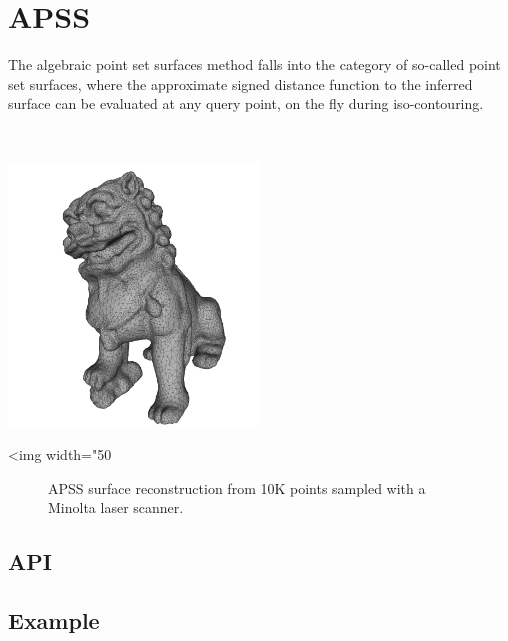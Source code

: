 \section{APSS}

The algebraic point set surfaces method falls \cite{Guennebaud07}  into the category of so-called point set surfaces, where the approximate signed distance function to the inferred surface can be evaluated at any query point, on the fly during iso-contouring.

  \\

\begin{center}
    \label{Surface_reconstruction_points_3-fig-APSS}
    \begin{ccTexOnly}
        \includegraphics[width=0.5\textwidth]{Surface_reconstruction_points_3/APSS} %
    \end{ccTexOnly}
    \begin{ccHtmlOnly}
        <img width="50%
    \end{ccHtmlOnly}
    \begin{figure}[h]
        \caption{APSS surface reconstruction from 10K
                 points sampled with a Minolta laser scanner.}
    \end{figure}
\end{center}


\subsection{API}

\subsection{Example}

